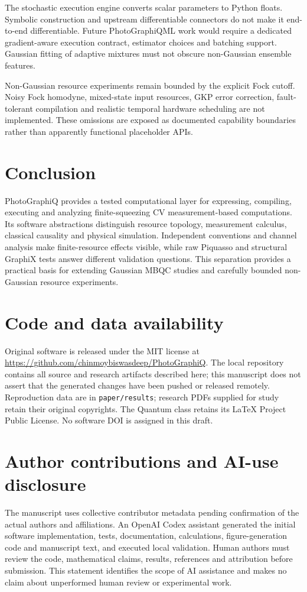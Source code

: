\documentclass[a4paper,twocolumn,11pt,nopdfoutputerror]{quantumarticle}
\begin{document}
The stochastic execution engine converts scalar parameters to Python floats.
Symbolic construction and upstream differentiable connectors do not make it
end-to-end differentiable. Future PhotoGraphiQML work would require a dedicated
gradient-aware execution contract, estimator choices and batching support.
Gaussian fitting of adaptive mixtures must not obscure non-Gaussian ensemble
features.

Non-Gaussian resource experiments remain bounded by the explicit Fock cutoff.
Noisy Fock homodyne, mixed-state input resources, GKP error correction,
fault-tolerant compilation and realistic temporal hardware scheduling are not
implemented. These omissions are exposed as documented capability boundaries
rather than apparently functional placeholder APIs.

\section{Conclusion}

PhotoGraphiQ provides a tested computational layer for expressing, compiling,
executing and analyzing finite-squeezing CV measurement-based computations.
Its software abstractions distinguish resource topology, measurement calculus,
classical causality and physical simulation. Independent conventions and channel
analysis make finite-resource effects visible, while raw Piquasso and structural
GraphiX tests answer different validation questions. This separation provides a
practical basis for extending Gaussian MBQC studies and carefully bounded
non-Gaussian resource experiments.

\section*{Code and data availability}
Original software is released under the MIT license at
\url{https://github.com/chinmoybiswasdeep/PhotoGraphiQ}. The local repository
contains all source and research artifacts described here; this manuscript does
not assert that the generated changes have been pushed or released remotely.
Reproduction data are in \texttt{paper/results}; research PDFs supplied for study
retain their original copyrights. The Quantum class retains its LaTeX Project
Public License. No software DOI is assigned in this draft.

\section*{Author contributions and AI-use disclosure}
The manuscript uses collective contributor metadata pending confirmation of the
actual authors and affiliations. An OpenAI Codex assistant generated the initial
software implementation, tests, documentation, calculations, figure-generation
code and manuscript text, and executed local validation. Human authors must
review the code, mathematical claims, results, references and attribution before
submission. This statement identifies the scope of AI assistance and makes no
claim about unperformed human review or experimental work.
\end{document}
